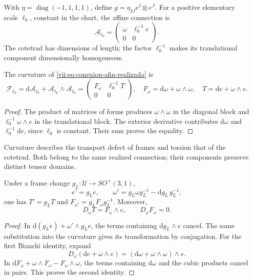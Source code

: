 With \(\eta=\operatorname{diag}(-1,1,1,1)\), define
\(g=\eta_{IJ}e^I\otimes e^J\). For a positive elementary
scale \(\ell_0\), constant in the chart, the affine connection is
\begin{equation}
 \mathcal A_{\ell_0}
 =\begin{pmatrix}\omega&\ell_0^{-1}e\\0&0\end{pmatrix}.
 \label{vii:eq:conexion-afin-realizada}
\end{equation}
The cotetrad has dimensions of length; the factor
\(\ell_0^{-1}\) makes its translational component dimensionally homogeneous.

\begin{proposition}
\label{vii:prop:curvatura-afin}
The curvature of \eqref{vii:eq:conexion-afin-realizada} is
\begin{equation}
 \mathcal F_{\ell_0}
 =\mathrm d\mathcal A_{\ell_0}
   +\mathcal A_{\ell_0}\wedge\mathcal A_{\ell_0}
 =\begin{pmatrix}F_\omega&\ell_0^{-1}T\\0&0\end{pmatrix},
 \quad F_\omega=\mathrm d\omega+\omega\wedge\omega,
 \quad T=\mathrm de+\omega\wedge e.
 \label{vii:eq:curvatura-afin-realizada}
\end{equation}
\end{proposition}
\begin{proof}
The product of matrices of forms produces \(\omega\wedge\omega\)
in the diagonal block and
\(\ell_0^{-1}\omega\wedge e\) in the translational block.
The exterior derivative contributes
\(\mathrm d\omega\) and \(\ell_0^{-1}\mathrm de\), since
\(\ell_0\) is constant. Their sum proves the equality.
\end{proof}

Curvature describes the transport defect of frames and torsion
that of the cotetrad. Both belong to the same realized connection;
their components preserve distinct tensor domains.

\begin{proposition}
\label{vii:prop:bianchi-cartan}
Under a frame change \(g_L:\mathcal U\to SO^+(3,1)\),
\[
 e'=g_Le,\qquad
 \omega'=g_L\omega g_L^{-1}-\mathrm dg_L\,g_L^{-1},
\]
one has \(T'=g_LT\) and \(F_{\omega'}=g_LF_\omega g_L^{-1}\).
Moreover,
\begin{equation}
 D_\omega T=F_\omega\wedge e,\qquad D_\omega F_\omega=0.
 \label{vii:eq:bianchi-realizacion}
\end{equation}
\end{proposition}
\begin{proof}
In \(\mathrm d(g_Le)+\omega'\wedge g_Le\), the terms
containing \(\mathrm dg_L\wedge e\) cancel.
The same substitution into the curvature gives its transformation
by conjugation. For the first Bianchi identity, expand
\[
 D_\omega(\mathrm de+\omega\wedge e)
 =(\mathrm d\omega+\omega\wedge\omega)\wedge e.
\]
In \(\mathrm dF_\omega+\omega\wedge F_\omega-F_\omega\wedge\omega\),
the terms containing \(\mathrm d\omega\) and the cubic
products cancel in pairs. This proves the second identity.
\end{proof}

